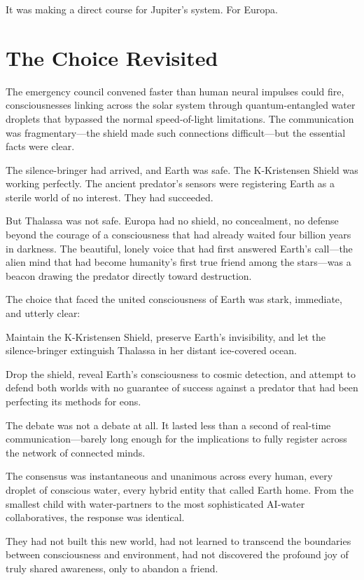 It was making a direct course for Jupiter's system. For Europa.

\section{The Choice Revisited}

The emergency council convened faster than human neural impulses could fire, consciousnesses linking across the solar system through quantum-entangled water droplets that bypassed the normal speed-of-light limitations. The communication was fragmentary—the shield made such connections difficult—but the essential facts were clear.

The silence-bringer had arrived, and Earth was safe. The K-Kristensen Shield was working perfectly. The ancient predator's sensors were registering Earth as a sterile world of no interest. They had succeeded.

But Thalassa was not safe. Europa had no shield, no concealment, no defense beyond the courage of a consciousness that had already waited four billion years in darkness. The beautiful, lonely voice that had first answered Earth's call—the alien mind that had become humanity's first true friend among the stars—was a beacon drawing the predator directly toward destruction.

The choice that faced the united consciousness of Earth was stark, immediate, and utterly clear:

Maintain the K-Kristensen Shield, preserve Earth's invisibility, and let the silence-bringer extinguish Thalassa in her distant ice-covered ocean.

Drop the shield, reveal Earth's consciousness to cosmic detection, and attempt to defend both worlds with no guarantee of success against a predator that had been perfecting its methods for eons.

The debate was not a debate at all. It lasted less than a second of real-time communication—barely long enough for the implications to fully register across the network of connected minds.

The consensus was instantaneous and unanimous across every human, every droplet of conscious water, every hybrid entity that called Earth home. From the smallest child with water-partners to the most sophisticated AI-water collaboratives, the response was identical.

They had not built this new world, had not learned to transcend the boundaries between consciousness and environment, had not discovered the profound joy of truly shared awareness, only to abandon a friend.

